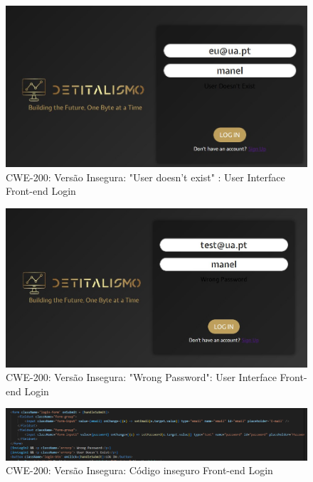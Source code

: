 \begin{figure}[H]
  \centering
  \includegraphics[width=16cm]{images/CWE-200-vulneravel1.jpg}
  \caption{CWE-200: Versão Insegura: "User doesn't exist" : User Interface Front-end Login }
  \label{fig:cwe200-vulneravel1}
\end{figure}

\begin{figure}[H]
  \centering
  \includegraphics[width=16cm]{images/CWE-200-vulneravel2.jpg}
  \caption{CWE-200: Versão Insegura: "Wrong Password": User Interface Front-end Login }
  \label{fig:cwe200-vulneravel2}
\end{figure}

\begin{figure}[H]
  \centering
  \includegraphics[width=16cm]{images/CWE-200-cod1v.png}
  \caption{CWE-200: Versão Insegura: Código inseguro Front-end Login }
  \label{fig:cwe200-cod1v}
\end{figure}

